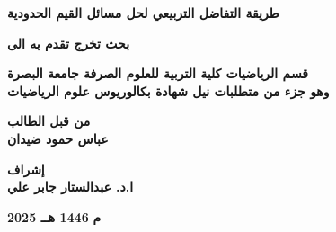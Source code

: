\begin{titlepage}
	\vspace{1cm}
	
	\begin{center}
		\Large \textbf{طريقة التفاضل التربيعي لحل مسائل القيم الحدودية}\\
	\end{center}
	\vfill
	
	\begin{center}
		\large
		\textbf{بحث تخرج تقدم به الى}
	\end{center}
	
	\begin{center}
		\large
		\textbf{قسم الرياضيات كلية التربية للعلوم الصرفة جامعة البصرة\\
			\vspace{6pt}
			وهو جزء من متطلبات نيل شهادة بكالوريوس علوم الرياضيات}
	\end{center}
	\vfill
	\begin{center}
		\large
		\textbf{من قبل الطالب}\\
		\vspace{8pt}
		 \large
		\textbf{عباس حمود ضيدان}
	\end{center}
	\vspace{10pt}
	\begin{center}
		\large
		\textbf{إشراف}\\
		\vspace{8pt}
		 \large
		\textbf{ا.د. عبدالستار جابر علي}
	\end{center}
	\vspace{80pt}
	\begingroup
\large{\raggedleft \textbf{2025 م}} {\hfill \textbf{1446 هــ}}
\endgroup
\end{titlepage}
\restoregeometry